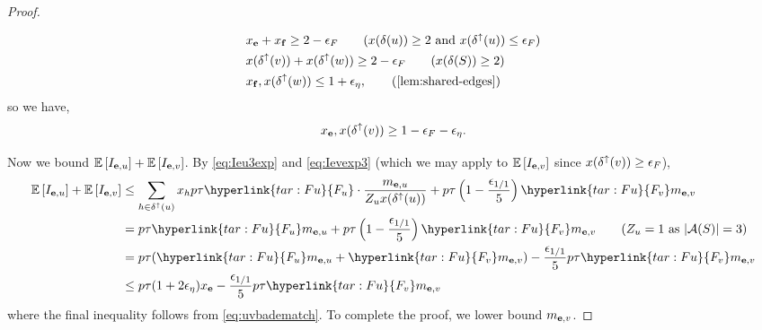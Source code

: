 \begin{proof}
\begin{figure}[htb]
\end{figure}
\begin{align*}
&x_\bbe + x_\bbf \ge 2 - \eps_F \tag{$x(\delta (u)) \ge 2$ and $x(\delta^\uparrow(u))\leq \eps_F$}\\
&x(\delta ^\uparrow (v)) + x(\delta ^\uparrow (w)) \ge 2- \eps_F \tag{$x(\delta (S))\geq 2$}\\
&x_\bbf, x(\delta^\uparrow(w))\leq 1+\eps_\eta,\tag{\cref{lem:shared-edges}}
\end{align*}
so we have, 
\begin{equation}\label{eq:edeltupvlarge}x_{\bf e}, x(\delta ^\uparrow (v)) \ge 1- {\epsilon}_F - {\epsilon}_\eta. 	
\end{equation}


Now we bound ${\mathbb{E}}\left[ I_{{\bf e},u}\right] + {\mathbb{E}}\left[ I_{{\bf e},v}\right]$. By \cref{eq:Ieu3exp} and \cref{eq:Ievexp3} (which we may apply to ${\mathbb{E}}\left[I_{{\bf e},v}\right]$ since $x(\delta^\uparrow(v))\geq {\epsilon}_F$),
\begin{align}
\E{I_{\bbe,u}}+\E{I_{\bbe,v}}&\leq \sum_{h \in \delta ^\uparrow (u)} x_h p \tau \hyperlink{tar:Fu}{F_u}\cdot \frac{ m_{\bbe,u}}{ Z_u x (\delta ^\uparrow (u))} +p\tau\left(1-\frac{\eps_{1/1}}{5}\right)\hyperlink{tar:Fu}{F_v} m_{\bbe,v}
\notag\\
&= p\tau \hyperlink{tar:Fu}{F_u} m_{\bbe,u}
+p\tau\left(1-\frac{\eps_{1/1}}{5}\right)\hyperlink{tar:Fu}{F_v} m_{\bbe,v} \tag{$Z_u=1$ as $|\cA(S)|=3$}\\
& = p\tau (\hyperlink{tar:Fu}{F_u}m_{\bbe,u}+\hyperlink{tar:Fu}{F_v} m_{\bbe,v}) - \frac{\eps_{1/1}}{5}p\tau \hyperlink{tar:Fu}{F_v}m_{\bbe,v} \notag\\
& \leq p\tau (1+2\eps_\eta)x_{\bbe} - \frac{\eps_{1/1}}{5}p\tau \hyperlink{tar:Fu}{F_v}m_{\bbe,v}\label{IeuIevS3}
\end{align}
where the final inequality follows from \eqref{eq:uvbadematch}.
To complete the proof, we lower bound $m_{{\bf e},v}$.


\end{proof}
